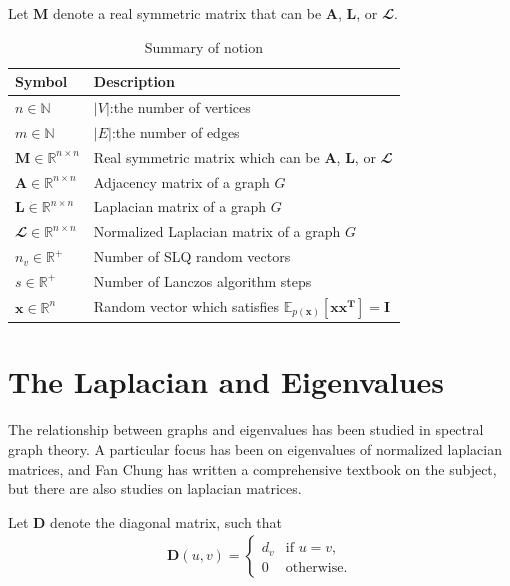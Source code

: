 \documentclass[senior,final,11pt]{iscs-thesis}
\begin{document}
Let ${\mathbf M}$ denote a real symmetric matrix that can be ${\mathbf A}$, ${\mathbf L}$, or ${\mathbfcal L}$.
\begin{table}[htb]
    \begin{center}
      \begin{tabular}{l l}
        \bf{Symbol} & \bf{Description} \\ \hline
        $n \in \mathbb{N}$ & $|V|$:the number of vertices \\
        $m \in \mathbb{N}$ & $|E|$:the number of edges \\ \hline
        ${\mathbf M} \in \mathbb{R}^{n\times n}$ & Real symmetric matrix which can be ${\mathbf A}$, ${\mathbf L}$, or ${\mathbfcal L}$\\
        ${\mathbf A} \in \mathbb{R}^{n\times n}$ & Adjacency matrix of a graph $G$ \\
        ${\mathbf L} \in \mathbb{R}^{n\times n}$ & Laplacian matrix of a graph $G$ \\
        ${\mathbfcal L} \in \mathbb{R}^{n\times n}$ & Normalized Laplacian matrix of a graph $G$ \\
        \hline
        $n_v \in \mathbb{R}^+$ & Number of SLQ random vectors \\
        $s \in \mathbb{R}^+$ & Number of Lanczos algorithm steps\\
        ${\mathbf x} \in \mathbb{R}^n$ & Random vector which satisfies $\mathbb{E}_{p(\mathbf{x})}[\mathbf{xx^T}] = \mathbf{I}$\\
        \hline
      \end{tabular}
      \caption{Summary of notion}
      \label{tab:notion}
    \end{center}
  \end{table}

\section{The Laplacian and Eigenvalues}
The relationship between graphs and eigenvalues has been studied in spectral graph theory. A particular focus has been on eigenvalues of normalized laplacian matrices, and Fan Chung has written a comprehensive textbook on the subject\cite{chung1997spectral}, but there are also studies on laplacian matrices.

Let ${\mathbf D}$ denote the diagonal matrix, such that
\begin{align*}
    \mathbf{D}(u,v) = \begin{cases}
        d_v & \text{if $u=v$}, \\
        0   & \text{otherwise.}
        \end{cases}
\end{align*}
\end{document}
